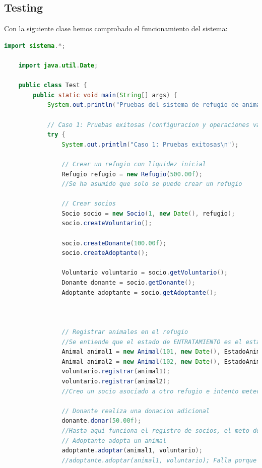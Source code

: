 \subsection{Testing}
Con la siguiente clase hemos comprobado el funcionamiento del sistema:
\begin{lstlisting}[style = javaNormal, language=Java] 
    import sistema.*;

    import java.util.Date;
    
    public class Test {
        public static void main(String[] args) {
            System.out.println("Pruebas del sistema de refugio de animales\n");
    
            // Caso 1: Pruebas exitosas (configuracion y operaciones validas)
            try {
                System.out.println("Caso 1: Pruebas exitosas\n");
    
                // Crear un refugio con liquidez inicial
                Refugio refugio = new Refugio(500.00f);
                //Se ha asumido que solo se puede crear un refugio
    
                // Crear socios
                Socio socio = new Socio(1, new Date(), refugio);
                socio.createVoluntario();
    
                socio.createDonante(100.00f);
                socio.createAdoptante();
    
                Voluntario voluntario = socio.getVoluntario();
                Donante donante = socio.getDonante();
                Adoptante adoptante = socio.getAdoptante();
    
    
                
                // Registrar animales en el refugio
                //Se entiende que el estado de ENTRATAMIENTO es el estado en el que se encuentra un animal que no esta ni disponible ni adoptado
                Animal animal1 = new Animal(101, new Date(), EstadoAnimal.ENTRATAMIENTO);
                Animal animal2 = new Animal(102, new Date(), EstadoAnimal.ENTRATAMIENTO);
                voluntario.registrar(animal1);
                voluntario.registrar(animal2); 
                //Creo un socio asociado a otro refugio e intento meter el mismo animal
    
                // Donante realiza una donacion adicional
                donante.donar(50.00f);
                //Hasta aqui funciona el registro de socios, el meto do donar y el meto do registrar funcionan perfactemente.
                // Adoptante adopta un animal
                adoptante.adoptar(animal1, voluntario);
                //adoptante.adoptar(animal1, voluntario); Falla porque el animal ya ha sido adoptado
    

\end{lstlisting}
